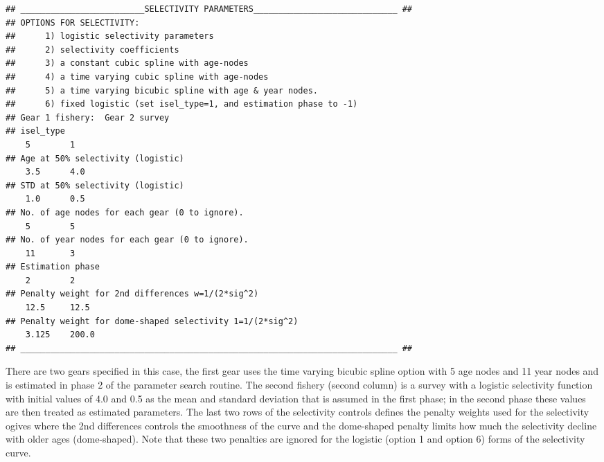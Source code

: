 \begin{multicols}{2}
\begin{tiny}
\begin{verbatim}
## _________________________SELECTIVITY PARAMETERS_____________________________ ##
## OPTIONS FOR SELECTIVITY:
##      1) logistic selectivity parameters
##      2) selectivity coefficients
##      3) a constant cubic spline with age-nodes
##      4) a time varying cubic spline with age-nodes
##      5) a time varying bicubic spline with age & year nodes.
##      6) fixed logistic (set isel_type=1, and estimation phase to -1)
## Gear 1 fishery:  Gear 2 survey
## isel_type
    5        1
## Age at 50% selectivity (logistic)
    3.5      4.0
## STD at 50% selectivity (logistic)
    1.0      0.5
## No. of age nodes for each gear (0 to ignore).
    5        5
## No. of year nodes for each gear (0 to ignore).
    11       3
## Estimation phase
    2        2
## Penalty weight for 2nd differences w=1/(2*sig^2)
    12.5     12.5
## Penalty weight for dome-shaped selectivity 1=1/(2*sig^2)
    3.125    200.0
## ____________________________________________________________________________ ##
\end{verbatim}
\end{tiny}
There are two gears specified in this case, the first gear uses the time varying bicubic spline option with 5 age nodes and 11 year nodes and is estimated in phase 2 of the parameter search routine.  The second fishery (second column) is a survey with a logistic selectivity function with initial values of 4.0 and 0.5 as the mean and standard deviation that is assumed in the first phase; in the second phase these values are then treated as estimated parameters.  The last two rows of the selectivity controls defines the penalty weights used for the selectivity ogives where the 2nd differences controls the smoothness of the curve and the dome-shaped penalty limits how much the selectivity decline with older ages (dome-shaped).  Note that these two penalties are ignored for the logistic (option 1 and option 6) forms of the selectivity curve.



\end{multicols}
